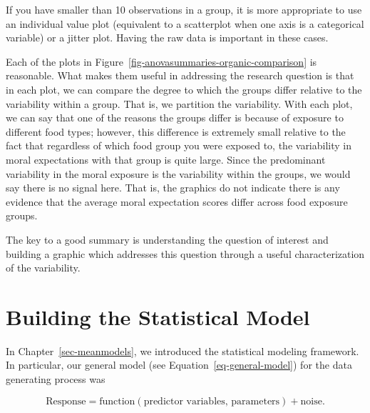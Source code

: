 \documentclass[
  letterpaper,
  DIV=11,
  numbers=noendperiod]{scrreprt}
\theoremstyle{plain}
\theoremstyle{definition}
\theoremstyle{definition}
\theoremstyle{remark}
\begin{document}
\begin{tcolorbox}[enhanced jigsaw, breakable, titlerule=0mm, colframe=quarto-callout-warning-color-frame, bottomtitle=1mm, opacityback=0, rightrule=.15mm, toptitle=1mm, arc=.35mm, bottomrule=.15mm, left=2mm, title=\textcolor{quarto-callout-warning-color}{\faExclamationTriangle}\hspace{0.5em}{Warning}, leftrule=.75mm, coltitle=black, toprule=.15mm, colbacktitle=quarto-callout-warning-color!10!white, colback=white, opacitybacktitle=0.6]

If you have smaller than 10 observations in a group, it is more
appropriate to use an individual value plot (equivalent to a scatterplot
when one axis is a categorical variable) or a jitter plot. Having the
raw data is important in these cases.

\end{tcolorbox}

Each of the plots in Figure~\ref{fig-anovasummaries-organic-comparison}
is reasonable. What makes them useful in addressing the research
question is that in each plot, we can compare the degree to which the
groups differ relative to the variability within a group. That is, we
partition the variability. With each plot, we can say that one of the
reasons the groups differ is because of exposure to different food
types; however, this difference is extremely small relative to the fact
that regardless of which food group you were exposed to, the variability
in moral expectations with that group is quite large. Since the
predominant variability in the moral exposure is the variability within
the groups, we would say there is no signal here. That is, the graphics
do not indicate there is any evidence that the average moral expectation
scores differ across food exposure groups.

The key to a good summary is understanding the question of interest and
building a graphic which addresses this question through a useful
characterization of the variability.

\chapter{Building the Statistical Model}\label{sec-anovamodel}

In Chapter~\ref{sec-meanmodels}, we introduced the statistical modeling
framework. In particular, our general model (see
Equation~\ref{eq-general-model}) for the data generating process was

\[\text{Response} = \text{function}(\text{predictor variables, parameters}) + \text{noise}.\]
\end{document}
